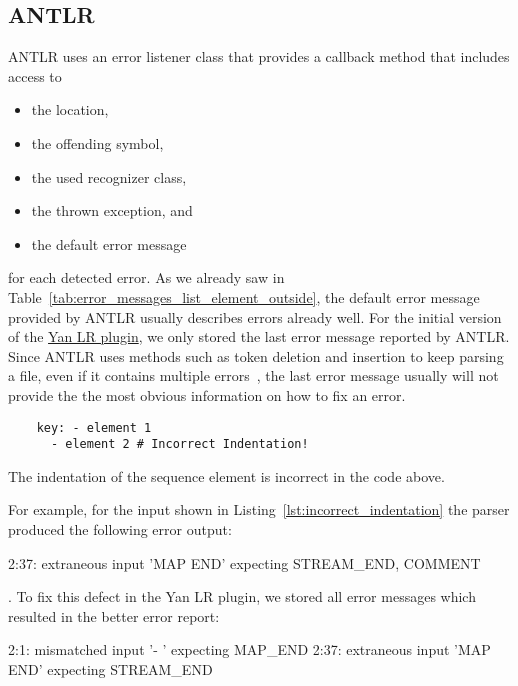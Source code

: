 \subsection{ANTLR}

ANTLR uses an error listener class that provides a callback method that includes access to

\begin{itemize}
  \item the location,
  \item the offending symbol,
  \item the used recognizer class,
  \item the thrown exception, and
  \item the default error message
\end{itemize}

for each detected error. As we already saw in Table~\ref{tab:error_messages_list_element_outside}, the default error message provided by ANTLR usually describes errors already well. For the initial version of the \href{http://libelektra.org/plugins/yanlr}{Yan LR plugin}, we only stored the last error message reported by ANTLR. Since ANTLR uses methods such as token deletion and insertion to keep parsing a file, even if it contains multiple errors~\cite{parr2013definitive}, the last error message usually will not provide the the most obvious information on how to fix an error.

\begin{listing}
  \begin{verbatim}
    key: - element 1
      - element 2 # Incorrect Indentation!
  \end{verbatim}
  \caption{The indentation of the sequence element  is incorrect in the code above.}
  \label{lst:incorrect_indentation}
\end{listing}

For example, for the input shown in Listing~\ref{lst:incorrect_indentation} the parser produced the following error output:

\begin{textcode}
  2:37: extraneous input 'MAP END' expecting {STREAM_END, COMMENT}
\end{textcode}

. To fix this defect in the Yan LR plugin, we stored all error messages which resulted in the better error report:

\begin{textcode}
  2:1: mismatched input '- ' expecting MAP_END
  2:37: extraneous input 'MAP END' expecting STREAM_END
\end{textcode}


